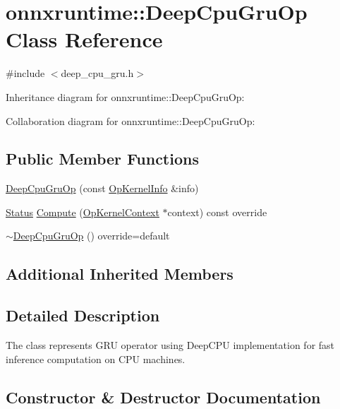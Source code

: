 \hypertarget{classonnxruntime_1_1DeepCpuGruOp}{}\section{onnxruntime\+:\+:Deep\+Cpu\+Gru\+Op Class Reference}
\label{classonnxruntime_1_1DeepCpuGruOp}


{\ttfamily \#include $<$deep\+\_\+cpu\+\_\+gru.\+h$>$}



Inheritance diagram for onnxruntime\+:\+:Deep\+Cpu\+Gru\+Op\+:


Collaboration diagram for onnxruntime\+:\+:Deep\+Cpu\+Gru\+Op\+:
\subsection*{Public Member Functions}
\begin{DoxyCompactItemize}
\item 
\mbox{\hyperlink{classonnxruntime_1_1DeepCpuGruOp_ab14e54cfa0a20f0d5531a0901a8cce9e}{Deep\+Cpu\+Gru\+Op}} (const \mbox{\hyperlink{classonnxruntime_1_1OpKernelInfo}{Op\+Kernel\+Info}} \&info)
\item 
\mbox{\hyperlink{classonnxruntime_1_1common_1_1Status}{Status}} \mbox{\hyperlink{classonnxruntime_1_1DeepCpuGruOp_a2a8b52f4c3e33f2633a18f2162bcf8fa}{Compute}} (\mbox{\hyperlink{classonnxruntime_1_1OpKernelContext}{Op\+Kernel\+Context}} $\ast$context) const override
\item 
\mbox{\hyperlink{classonnxruntime_1_1DeepCpuGruOp_a039a3bc8dbcdaad3d8ad3ed00cf4dcd6}{$\sim$\+Deep\+Cpu\+Gru\+Op}} () override=default
\end{DoxyCompactItemize}
\subsection*{Additional Inherited Members}


\subsection{Detailed Description}
The class represents G\+RU operator using Deep\+C\+PU implementation for fast inference computation on C\+PU machines. 

\subsection{Constructor \& Destructor Documentation}
\mbox{\label{classonnxruntime_1_1DeepCpuGruOp_ab14e54cfa0a20f0d5531a0901a8cce9e}} 
